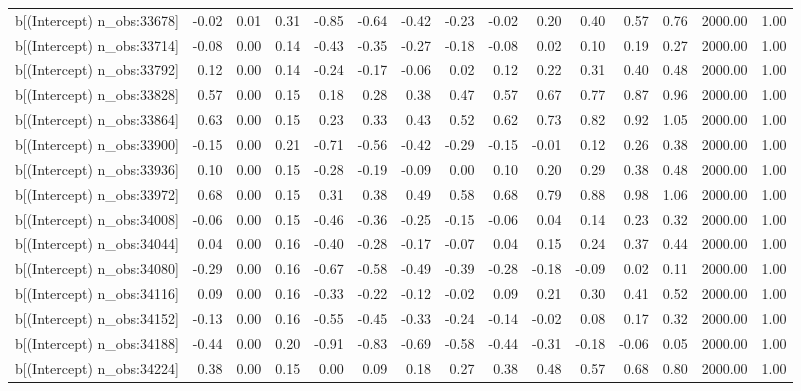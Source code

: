 \begin{table}[ht]
\begin{tabular}{rrrrrrrrrrrrrrr}
  b[(Intercept) n\_obs:33678] & -0.02 & 0.01 & 0.31 & -0.85 & -0.64 & -0.42 & -0.23 & -0.02 & 0.20 & 0.40 & 0.57 & 0.76 & 2000.00 & 1.00 \\ 
  b[(Intercept) n\_obs:33714] & -0.08 & 0.00 & 0.14 & -0.43 & -0.35 & -0.27 & -0.18 & -0.08 & 0.02 & 0.10 & 0.19 & 0.27 & 2000.00 & 1.00 \\ 
  b[(Intercept) n\_obs:33792] & 0.12 & 0.00 & 0.14 & -0.24 & -0.17 & -0.06 & 0.02 & 0.12 & 0.22 & 0.31 & 0.40 & 0.48 & 2000.00 & 1.00 \\ 
  b[(Intercept) n\_obs:33828] & 0.57 & 0.00 & 0.15 & 0.18 & 0.28 & 0.38 & 0.47 & 0.57 & 0.67 & 0.77 & 0.87 & 0.96 & 2000.00 & 1.00 \\ 
  b[(Intercept) n\_obs:33864] & 0.63 & 0.00 & 0.15 & 0.23 & 0.33 & 0.43 & 0.52 & 0.62 & 0.73 & 0.82 & 0.92 & 1.05 & 2000.00 & 1.00 \\ 
  b[(Intercept) n\_obs:33900] & -0.15 & 0.00 & 0.21 & -0.71 & -0.56 & -0.42 & -0.29 & -0.15 & -0.01 & 0.12 & 0.26 & 0.38 & 2000.00 & 1.00 \\ 
  b[(Intercept) n\_obs:33936] & 0.10 & 0.00 & 0.15 & -0.28 & -0.19 & -0.09 & 0.00 & 0.10 & 0.20 & 0.29 & 0.38 & 0.48 & 2000.00 & 1.00 \\ 
  b[(Intercept) n\_obs:33972] & 0.68 & 0.00 & 0.15 & 0.31 & 0.38 & 0.49 & 0.58 & 0.68 & 0.79 & 0.88 & 0.98 & 1.06 & 2000.00 & 1.00 \\ 
  b[(Intercept) n\_obs:34008] & -0.06 & 0.00 & 0.15 & -0.46 & -0.36 & -0.25 & -0.15 & -0.06 & 0.04 & 0.14 & 0.23 & 0.32 & 2000.00 & 1.00 \\ 
  b[(Intercept) n\_obs:34044] & 0.04 & 0.00 & 0.16 & -0.40 & -0.28 & -0.17 & -0.07 & 0.04 & 0.15 & 0.24 & 0.37 & 0.44 & 2000.00 & 1.00 \\ 
  b[(Intercept) n\_obs:34080] & -0.29 & 0.00 & 0.16 & -0.67 & -0.58 & -0.49 & -0.39 & -0.28 & -0.18 & -0.09 & 0.02 & 0.11 & 2000.00 & 1.00 \\ 
  b[(Intercept) n\_obs:34116] & 0.09 & 0.00 & 0.16 & -0.33 & -0.22 & -0.12 & -0.02 & 0.09 & 0.21 & 0.30 & 0.41 & 0.52 & 2000.00 & 1.00 \\ 
  b[(Intercept) n\_obs:34152] & -0.13 & 0.00 & 0.16 & -0.55 & -0.45 & -0.33 & -0.24 & -0.14 & -0.02 & 0.08 & 0.17 & 0.32 & 2000.00 & 1.00 \\ 
  b[(Intercept) n\_obs:34188] & -0.44 & 0.00 & 0.20 & -0.91 & -0.83 & -0.69 & -0.58 & -0.44 & -0.31 & -0.18 & -0.06 & 0.05 & 2000.00 & 1.00 \\ 
  b[(Intercept) n\_obs:34224] & 0.38 & 0.00 & 0.15 & 0.00 & 0.09 & 0.18 & 0.27 & 0.38 & 0.48 & 0.57 & 0.68 & 0.80 & 2000.00 & 1.00 \\ 

\end{tabular}
\end{table}
